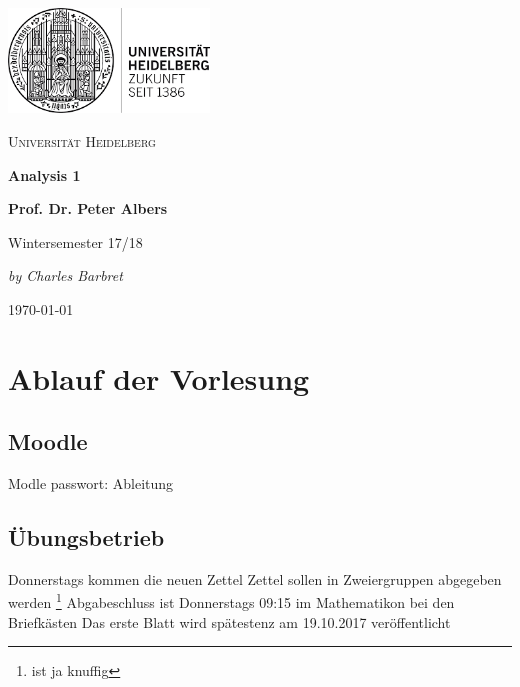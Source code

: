 \documentclass[12pt,a4paper]{article} %
\begin{document}
	\begin{titlepage} %
	\centering
	\includegraphics[width=0.40\textwidth]{UniLogo}\par\vspace{1cm}
		{\scshape\LARGE Universität Heidelberg \par}
		\vspace{1cm}
		{\Huge\bfseries Analysis 1 \par}
		\vspace{1cm}
		{\LARGE\bfseries Prof. Dr. Peter Albers \par}
		\vspace{1cm}
		{\huge Wintersemester 17/18 \par}
		\vspace{2cm}
		{\Large\itshape by Charles Barbret \par}
		
		\vfill

		{\large \gerDate\today\par}
	\end{titlepage}

\tableofcontents %
\newpage %


\section*{Ablauf der Vorlesung}
\subsection{Moodle}
Modle passwort: Ableitung
\subsection{Übungsbetrieb}
Donnerstags kommen die neuen Zettel \newline
Zettel sollen in Zweiergruppen abgegeben werden \footnote{ist ja knuffig} \newline
Abgabeschluss ist Donnerstags 09:15 im Mathematikon bei den Briefkästen \newline
Das erste Blatt wird spätestenz am 19.10.2017 veröffentlicht 
\end{document}
